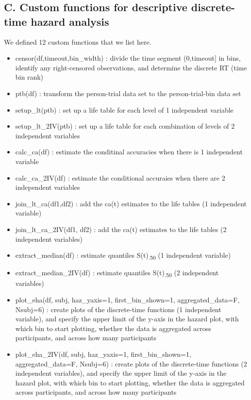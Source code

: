 \documentclass[
  man,floatsintext]{apa6}
\providecommand{\tightlist}{%
  \setlength{\itemsep}{0pt}\setlength{\parskip}{0pt}}
\begin{document}
\subsection{C. Custom functions for descriptive discrete-time hazard analysis}\label{c.-custom-functions-for-descriptive-discrete-time-hazard-analysis}

We defined 12 custom functions that we list here.

\begin{itemize}
\tightlist
\item
  censor(df,timeout,bin\_width) : divide the time segment (0,timeout{]} in bins, identify any right-censored observations, and determine the discrete RT (time bin rank)
\item
  ptb(df) : transform the person-trial data set to the person-trial-bin data set
\item
  setup\_lt(ptb) : set up a life table for each level of 1 independent variable
\item
  setup\_lt\_2IV(ptb) : set up a life table for each combination of levels of 2 independent variables
\item
  calc\_ca(df) : estimate the conditinal accuracies when there is 1 independent variable
\item
  calc\_ca\_2IV(df) : estimate the conditional accuraies when there are 2 independent variables
\item
  join\_lt\_ca(df1,df2) : add the ca(t) estimates to the life tables (1 independent variable)
\item
  join\_lt\_ca\_2IV(df1, df2) : add the ca(t) estimates to the life tables (2 independent variables)
\item
  extract\_median(df) : estimate quantiles S(t)\textsubscript{.50} (1 independent variable)
\item
  extract\_median\_2IV(df) : estimate quantiles S(t)\textsubscript{.50} (2 independent variables)
\item
  plot\_eha(df, subj, haz\_yaxis=1, first\_bin\_shown=1, aggregated\_data=F, Nsubj=6) : create plots of the discrete-time functions (1 independent variable), and specify the upper limit of the y-axis in the hazard plot, with which bin to start plotting, whether the data is aggregated across participants, and across how many participants
\item
  plot\_eha\_2IV(df, subj, haz\_yaxis=1, first\_bin\_shown=1, aggregated\_data=F, Nsubj=6) : create plots of the discrete-time functions (2 independent variables), and specify the upper limit of the y-axis in the hazard plot, with which bin to start plotting, whether the data is aggregated across participants, and across how many participants
\end{itemize}
\end{document}
